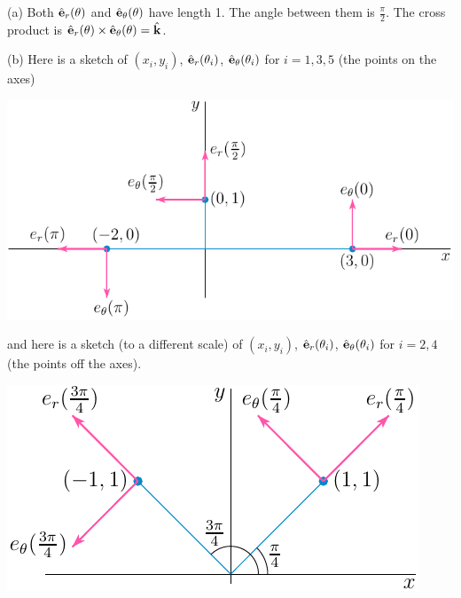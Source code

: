 \begin{answer} 
(a) Both $\hat{\mathbf{e}}_r(\theta)$ and $\hat{\mathbf{e}}_\theta(\theta)$ have length 1.
The angle between them is $\frac{\pi}{2}$. The cross product is
$\hat{\mathbf{e}}_r(\theta) \times \hat{\mathbf{e}}_\theta(\theta)=\hat{\mathbf{k}}$.

(b)
Here is a sketch of $(x_i,y_i)$, $\hat{\mathbf{e}}_r(\theta_i)$,
$\hat{\mathbf{e}}_\theta(\theta_i)$ for $i =1,3,5$ (the points on the axes)
\begin{center}
  \includegraphics{fig/polar3.pdf}
\end{center}
and here is a sketch (to a different scale) of $(x_i,y_i)$, $\hat{\mathbf{e}}_r(\theta_i)$,
$\hat{\mathbf{e}}_\theta(\theta_i)$ for $i =2,4$ (the points off the axes).
\begin{center}       
  \includegraphics{fig/polar2.pdf}
\end{center}
\end{answer}


